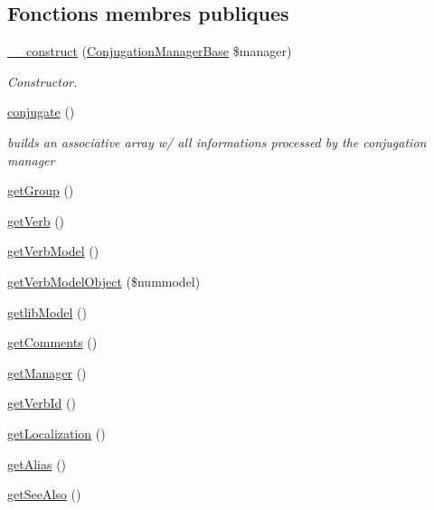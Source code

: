 \subsection*{Fonctions membres publiques}
\begin{DoxyCompactItemize}
\item 
\hyperlink{class_conjugation_base_aff646e04e878c9dd1473de4619fe1bcc}{\+\_\+\+\_\+construct} (\hyperlink{class_conjugation_manager_base}{Conjugation\+Manager\+Base} \$manager)
\begin{DoxyCompactList}\small\item\em Constructor. \end{DoxyCompactList}\item 
\hyperlink{class_conjugation_base_a8137cfd9e8f57dafedd5cc724d57b9e6}{conjugate} ()
\begin{DoxyCompactList}\small\item\em builds an associative array w/ all informations processed by the conjugation manager \end{DoxyCompactList}\item 
\hyperlink{class_conjugation_base_aa88c93007f333b916a6a51819e50e8ae}{get\+Group} ()
\item 
\hyperlink{class_conjugation_base_a732cbfda6f4c28efeec68fc85aa9b65a}{get\+Verb} ()
\item 
\hyperlink{class_conjugation_base_aaa7ecb3341682d48f2d2b42810de2ac2}{get\+Verb\+Model} ()
\item 
\hyperlink{class_conjugation_base_a31a6fb3f63b144c6d9f0e9a27d3d28cc}{get\+Verb\+Model\+Object} (\$nummodel)
\item 
\hyperlink{class_conjugation_base_a52db22137154c2fd7a8487406b959652}{getlib\+Model} ()
\item 
\hyperlink{class_conjugation_base_ac381d5a6d6411aba279cb56e8505bb30}{get\+Comments} ()
\item 
\hyperlink{class_conjugation_base_aab285eff4995c059a3aa0abec778a390}{get\+Manager} ()
\item 
\hyperlink{class_conjugation_base_a918aff5acf4210cf363a13cf39e2430d}{get\+Verb\+Id} ()
\item 
\hyperlink{class_conjugation_base_a27cc8f5f2a3b502e48c22a5b547181ac}{get\+Localization} ()
\item 
\hyperlink{class_conjugation_base_ac8266b933fde0f494a7933c4d2fe0590}{get\+Alias} ()
\item 
\hyperlink{class_conjugation_base_a76d7179c150a4e32fb410d5af9bc388c}{get\+See\+Also} ()
\item 

\end{DoxyCompactItemize}
